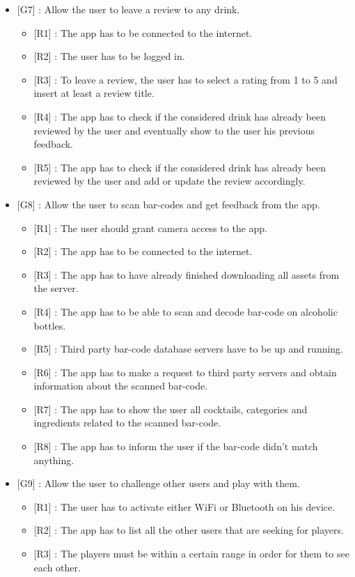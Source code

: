 \documentclass[paper=a4, fontsize=12pt]{scrartcl}
\numberwithin{equation}{section}		%
\numberwithin{figure}{section}			%
\numberwithin{table}{section}				%
\begin{document}
\begin{itemize}
\item {[G7]} : Allow the user to leave a review to any drink.
\begin{itemize}
\item {[R1]} : The app has to be connected to the internet.
\item {[R2]} : The user has to be logged in.
\item {[R3]} : To leave a review, the user has to select a rating from 1 to 5 and insert at least a review title.
\item {[R4]} : The app has to check if the considered drink has already been reviewed by the user and eventually show to the user his previous feedback. 
\item {[R5]} : The app has to check if the considered drink has already been reviewed by the user and add or update the review accordingly. 
\end{itemize}
\item {[G8]} : Allow the user to scan bar-codes and get feedback from the app.
\begin{itemize}
\item {[R1]} : The user should grant camera access to the app.
\item {[R2]} : The app has to be connected to the internet.
\item {[R3]} : The app has to have already finished downloading all assets from the server.
\item {[R4]} : The app has to be able to scan and decode bar-code on alcoholic bottles.
\item {[R5]} : Third party bar-code database servers have to be up and running.
\item {[R6]} : The app has to make a request to third party servers and obtain information about the scanned bar-code.
\item {[R7]} : The app has to show the user all cocktails, categories and ingredients related to the scanned bar-code.
\item {[R8]} : The app has to inform the user if the bar-code didn't match anything.
\end{itemize}
\item {[G9]} : Allow the user to challenge other users and play with them.
\begin{itemize}
\item {[R1]} : The user has to activate either WiFi or Bluetooth on his device.
\item {[R2]} : The app has to list all the other users that are seeking for players.
\item {[R3]} : The players must be within a certain range in order for them to see each other.

\end{itemize}
\end{itemize}
\end{document}
